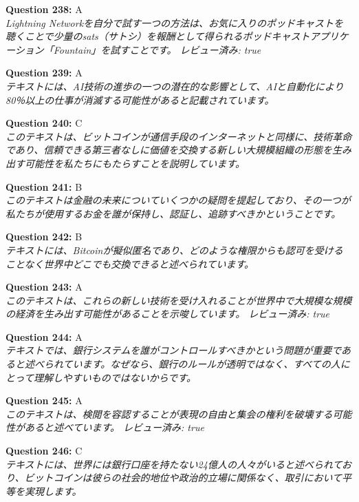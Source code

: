 \documentclass[12pt,a4paper]{article}
\begin{document}
\begin{enumerate}
{{{{{{{{{{\item \textbf{Question 238:} A
\\ \textit{Lightning Networkを自分で試す一つの方法は、お気に入りのポッドキャストを聴くことで少量のsats（サトシ）を報酬として得られるポッドキャストアプリケーション「Fountain」を試すことです。 レビュー済み: true}

\item \textbf{Question 239:} A
\\ \textit{テキストには、AI技術の進歩の一つの潜在的な影響として、AIと自動化により80％以上の仕事が消滅する可能性があると記載されています。}

\item \textbf{Question 240:} C
\\ \textit{このテキストは、ビットコインが通信手段のインターネットと同様に、技術革命であり、信頼できる第三者なしに価値を交換する新しい大規模組織の形態を生み出す可能性を私たちにもたらすことを説明しています。}

\item \textbf{Question 241:} B
\\ \textit{このテキストは金融の未来についていくつかの疑問を提起しており、その一つが私たちが使用するお金を誰が保持し、認証し、追跡すべきかということです。}

\item \textbf{Question 242:} B
\\ \textit{テキストには、Bitcoinが擬似匿名であり、どのような権限からも認可を受けることなく世界中どこでも交換できると述べられています。}

\item \textbf{Question 243:} A
\\ \textit{このテキストは、これらの新しい技術を受け入れることが世界中で大規模な規模の経済を生み出す可能性があることを示唆しています。 レビュー済み: true}

\item \textbf{Question 244:} A
\\ \textit{テキストでは、銀行システムを誰がコントロールすべきかという問題が重要であると述べられています。なぜなら、銀行のルールが透明ではなく、すべての人にとって理解しやすいものではないからです。}

\item \textbf{Question 245:} A
\\ \textit{このテキストは、検閲を容認することが表現の自由と集会の権利を破壊する可能性があると述べています。 レビュー済み: true}

\item \textbf{Question 246:} C
\\ \textit{テキストには、世界には銀行口座を持たない24億人の人々がいると述べられており、ビットコインは彼らの社会的地位や政治的立場に関係なく、取引において平等を実現します。}

}}}}}}}}}}
\end{enumerate}
\end{document}
